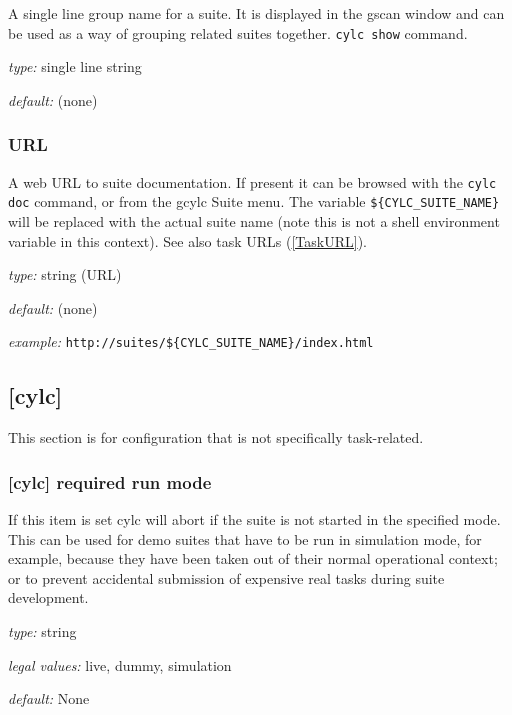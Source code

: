 A single line group name for a suite. It is displayed in the gscan
window and can be used as a way of grouping related suites together.
\lstinline=cylc show= command.

\begin{myitemize}
\item {\em type:} single line string
\item {\em default:} (none)
\end{myitemize}

\subsubsection{URL} \label{SuiteURL}

A web URL to suite documentation.  If present it can be browsed with the
\lstinline=cylc doc= command, or from the gcylc Suite menu.  The variable
\lstinline=${CYLC_SUITE_NAME}= will be replaced with the actual suite name
(note this is not a shell environment variable in this context). See also
task URLs (\ref{TaskURL}).

\begin{myitemize}
\item {\em type:} string (URL)
\item {\em default:} (none)
\item {\em example:} \lstinline=http://suites/${CYLC_SUITE_NAME}/index.html=
\end{myitemize}

\subsection{[cylc]}

This section is for configuration that is not specifically task-related.

\subsubsection[required run mode]{ [cylc] \textrightarrow required run mode}

If this item is set cylc will abort if the suite is not started in the
specified mode. This can be used for demo suites that have to be
run in simulation mode, for example, because they have been taken out of
their normal operational context; or to prevent accidental submission of
expensive real tasks during suite development.
\begin{myitemize}
    \item {\em type:} string
    \item {\em legal values:} live, dummy, simulation
    \item {\em default:} None
\end{myitemize}

